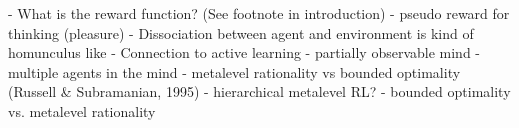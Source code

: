 \label{conclusion}


- What is the reward function? (See footnote in introduction)
- pseudo reward for thinking (pleasure)
- Dissociation between agent and environment is kind of homunculus like
- Connection to active learning
- partially observable mind
- multiple agents in the mind
- metalevel rationality vs bounded optimality (Russell \& Subramanian, 1995)
- hierarchical metalevel RL?
- bounded optimality vs. metalevel rationality